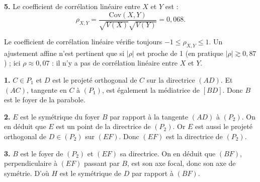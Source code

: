 \documentclass[11pt]{article}
\begin{document}
\textbf{5.} Le coefficient de corrélation linéaire entre $X$ et $Y$ est :
\[ \rho_{X,Y} = \frac{\mathrm{Cov}(X, Y)}{\sqrt{V(X)}\sqrt{V(Y)}} = 0{,}068. \]

\begin{rappel}
Le coefficient de corrélation linéaire vérifie toujours
$-1 \le \rho_{X,Y} \le 1$. Un ajustement affine n'est pertinent que si
$|\rho|$ est proche de 1 (en pratique $|\rho| \gtrsim 0{,}87$) ; ici
$\rho \approx 0{,}07$ : il n'y a pas de corrélation linéaire entre $X$
et $Y$.
\end{rappel}

\prob{}

\begin{center}
\end{center}

\textbf{1.} $C \in P_1$ et $D$ est le projeté orthogonal de $C$ sur la directrice $(AD)$. Et $(AC)$, tangente en $C$ à $(P_1)$, est également la médiatrice de $[BD]$. Donc $B$ est le foyer de la parabole.

\textbf{2.} $E$ est le symétrique du foyer $B$ par rapport à la tangente $(AD)$ à $(P_2)$. On en déduit que $E$ est un point de la directrice de $(P_2)$. Or $E$ est aussi le projeté orthogonal de $D \in (P_2)$ sur $(EF)$. Donc $(EF)$ est la directrice de $(P_2)$.

\textbf{3.} $B$ est le foyer de $(P_2)$ et $(EF)$ sa directrice. On en déduit que $(BF)$, perpendiculaire à $(EF)$ passant par $B$, est son axe focal, donc son axe de symétrie. D'où $H$ est le symétrique de $D$ par rapport à $(BF)$.
\end{document}
